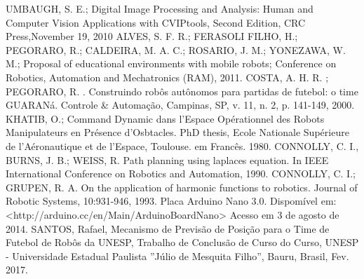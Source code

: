 \begin{thebibliography}{99}

 UMBAUGH, S. E.; Digital Image Processing and Analysis: Human and Computer Vision Applications with CVIPtools, Second Edition, CRC Press,November 19, 2010
 ALVES, S. F. R.; FERASOLI FILHO, H.; PEGORARO, R.; CALDEIRA, M. A. C.; ROSARIO, J. M.; YONEZAWA, W. M.; Proposal of educational environments with mobile robots; Conference on Robotics, Automation and Mechatronics (RAM), 2011.
 COSTA, A. H. R. ; PEGORARO, R. . Construindo rob{\^o}s aut{\^o}nomos para partidas de futebol: o time GUARAN{\'a}. Controle \& Automa{\c c}{\~a}o, Campinas, SP, v. 11, n. 2, p. 141-149, 2000.
 KHATIB, O.; Command Dynamic dans l'Espace Op{\'e}rationnel des Robots Manipulateurs en Pr{\'e}sence d'Osbtacles. PhD thesis, Ecole Nationale Sup{\'e}rieure de l'A{\'e}ronautique et de l'Espace, Toulouse. em Franc{\^e}s. 1980.
 CONNOLLY, C. I., BURNS, J. B.; WEISS, R. Path planning using laplaces equation. In IEEE International Conference on Robotics and Automation, 1990.
 CONNOLLY, C. I.; GRUPEN, R. A. On the application of harmonic functions to robotics. Journal of Robotic Systems, 10:931-946, 1993. Placa Arduino Nano 3.0. Dispom{\'i}vel em: <http://arduino.cc/en/Main/ArduinoBoardNano> Acesso em 3 de agosto de 2014.
 SANTOS, Rafael, Mecanismo de Previs{\~a}o de Posi{\c c}{\~a}o para o Time de Futebol de Rob{\^o}s da UNESP, Trabalho de Conclus{\~a}o de Curso do Curso, UNESP - Universidade Estadual Paulista ''J{\'u}lio de Mesquita Filho'', Bauru, Brasil, Fev. 2017.

\end{thebibliography} 
